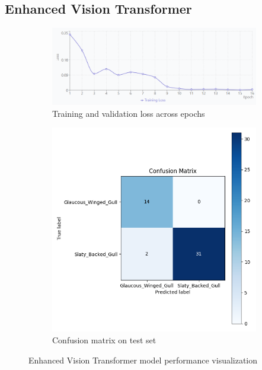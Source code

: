 \documentclass[a4paper,12pt]{report}
\begin{document}
\subsection{Enhanced Vision Transformer}
\begin{figure}[H]
    \centering
    \begin{subfigure}[b]{0.48\textwidth}
        \centering
        \includegraphics[width=\textwidth]{images/appendix/modelgraph/enhancedvit/enhancedvit.png}
        \caption{Training and validation loss across epochs}
        \label{fig:enhancedvit_training}
    \end{subfigure}
    \hfill
    \begin{subfigure}[b]{0.48\textwidth}
        \centering
        \includegraphics[width=\textwidth]{images/appendix/modelgraph/enhancedvit/confusion_matrix.png}
        \caption{Confusion matrix on test set}
        \label{fig:enhancedvit_confusion}
    \end{subfigure}
    \caption{Enhanced Vision Transformer model performance visualization}
    \label{fig:enhancedvit_performance}
\end{figure}
\end{document}
